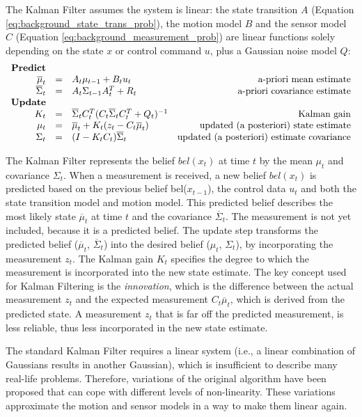 The Kalman Filter assumes the system is linear: the state transition $A$ (Equation \ref{eq:background_state_trans_prob}), the motion model $B$ and the sensor model $C$ (Equation \ref{eq:background_measurement_prob}) are linear functions solely depending on the state $x$ or control command $u$, plus a Gaussian noise model $Q$:
\begin{equation}
\label{eq:KF}
\begin{array}{rclr}
\text{\textbf{Predict}} \\
\overline{\mu}_t & = & A_t \mu_{t-1} + B_t u_t  & \text{a-priori mean estimate} \\
\overline{\Sigma}_t & = & A_t \Sigma_{t-1} A_t^T + R_t  & \text{a-priori covariance estimate} \\
\text{\textbf{Update}} \\
K_t & = & \overline{\Sigma}_t C_t^T (C_t \overline{\Sigma}_t C_t^T + Q_t)^{-1} & \text{Kalman gain} \\
\mu_t & = & \overline{\mu}_t + K_t(z_t - C_t \overline{\mu}_t) & \text{updated (a posteriori) state estimate} \\
\Sigma_t & = & (I - K_t C_t) \overline{\Sigma}_t & \text{updated (a posteriori) estimate covariance}
\end{array}
\end{equation}

The Kalman Filter represents the belief $bel(x_t)$ at time $t$ by the mean $\mu_t$ and covariance $\Sigma_t$.
When a measurement is received, a new belief $bel(x_t)$ is predicted based on the previous belief bel($x_{t-1}$), the control data $u_t$ and both the state transition model and motion model.
This predicted belief describes the most likely state $\overline{\mu}_t$ at time $t$ and the covariance $\overline{\Sigma}_t$.
The measurement is not yet included, because it is a predicted belief.
The update step transforms the predicted belief ($\overline{\mu}_t$, $\overline{\Sigma}_t$) into the desired belief ($\mu_t$, $\Sigma_t$), by incorporating the measurement $z_t$.
The Kalman gain $K_t$ specifies the degree to which the measurement is incorporated into the new state estimate.
The key concept used for Kalman Filtering is the \textit{innovation}, which is the difference between the actual measurement $z_t$ and the expected measurement $C_t \overline{\mu}_t$, which is derived from the predicted state.
A measurement $z_t$ that is far off the predicted measurement, is less reliable, thus less incorporated in the new state estimate.

The standard Kalman Filter requires a linear system (i.e., a linear combination of Gaussians results in another Gaussian), which is insufficient to describe many real-life problems.
Therefore, variations of the original algorithm have been proposed that can cope with different levels of non-linearity.
These variations approximate the motion and sensor models in a way to make them linear again.

